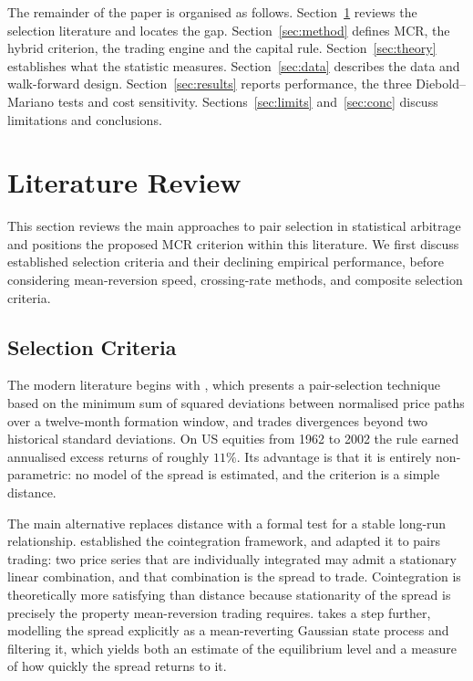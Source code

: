 \documentclass[11pt,a4paper]{article}
\theoremstyle{definition}
\newcommand{\MCR}{\ensuremath{\mathrm{MCR}}}
\begin{document}
The remainder of the paper is organised as follows. Section~\ref{sec:lit}
reviews the selection literature and locates the gap. Section~\ref{sec:method}
defines \MCR, the hybrid criterion, the trading engine and the capital rule.
Section~\ref{sec:theory} establishes what the statistic measures.
Section~\ref{sec:data} describes the data and walk-forward design.
Section~\ref{sec:results} reports performance, the three Diebold--Mariano tests
and cost sensitivity. Sections~\ref{sec:limits} and~\ref{sec:conc} discuss
limitations and conclusions.

\section{Literature Review}
\label{sec:lit}
This section reviews the main approaches to pair selection in statistical
arbitrage and positions the proposed MCR criterion within this literature.
We first discuss established selection criteria and their declining empirical
performance, before considering mean-reversion speed, crossing-rate methods,
and composite selection criteria.

\subsection{Selection Criteria}

The modern literature begins with \citet{gatev2006}, which presents a pair-selection
technique based on the minimum sum of squared deviations between normalised price
paths over a twelve-month formation window, and trades divergences beyond two
historical standard deviations. On US equities from 1962 to 2002 the rule earned
annualised excess returns of roughly $11\%$. Its advantage is that it is entirely
non-parametric: no model of the spread is estimated, and the criterion is a
simple distance.

The main alternative replaces distance with a formal test for a stable long-run
relationship. \citet{engle1987} established the cointegration framework, and
\citet{vidyamurthy2004} adapted it to pairs trading: two price series that are
individually integrated may admit a stationary linear combination, and that
combination is the spread to trade. Cointegration is theoretically more
satisfying than distance because stationarity of the spread is precisely the
property mean-reversion trading requires. \citet{elliott2005} takes a step further,
modelling the spread explicitly as a mean-reverting Gaussian state process
and filtering it, which yields both an estimate of the equilibrium level and a
measure of how quickly the spread returns to it.
\end{document}
